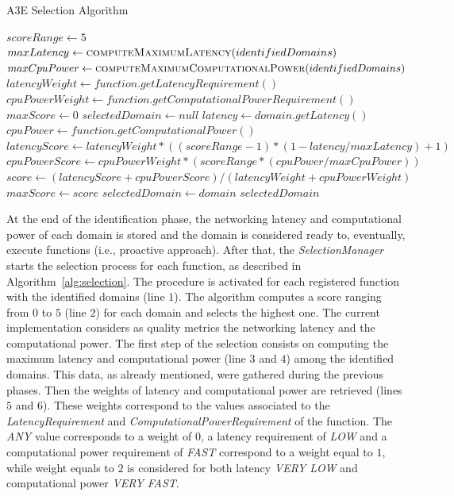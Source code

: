 \begin{algorithm}[b]
	\caption{A3E Selection Algorithm}
	\label{alg:selection}
	\begin{algorithmic}[1]
		
		\State$scoreRange \gets 5$
		\State $maxLatency \gets \Call{computeMaximumLatency}{identifiedDomains}$
		\State $maxCpuPower \gets \Call{computeMaximumComputationalPower}{identifiedDomains}$
		\State $latencyWeight \gets function.getLatencyRequirement()$ 
		\State $cpuPowerWeight \gets function.getComputationalPowerRequirement()$ 
		\State $maxScore \gets 0$
		\State $selectedDomain \gets null$
		\State $latency \gets domain.getLatency()$ 
		\State $cpuPower \gets function.getComputationalPower()$ 
		\State $latencyScore \gets latencyWeight*((scoreRange-1)*(1 - latency/maxLatency)+1)$ 
		\State $cpuPowerScore \gets cpuPowerWeight*(scoreRange*(cpuPower/maxCpuPower))$
		\State $score \gets (latencyScore + cpuPowerScore) / (latencyWeight + cpuPowerWeight)$
		\State $maxScore \gets score$
		\State $selectedDomain \gets domain$
		\EndIf
		\EndFor 
		\State \Return $selectedDomain$
		\EndFunction
	\end{algorithmic}
\end{algorithm}

At the end of the identification phase, the networking latency and computational power of each domain is stored and the domain is considered ready to, eventually, execute functions (i.e., proactive approach). After that, the \textit{SelectionManager} starts the selection process for each function, as described in Algorithm~\ref{alg:selection}. The procedure is activated for each registered function with the identified domains (line $1$). The algorithm computes a score ranging from $0$ to $5$ (line $2$) for each domain and selects the highest one. The current implementation considers as quality metrics the networking latency and the computational power. The first step of the selection consists on computing the maximum latency and computational power (line $3$ and $4$) among the identified domains. This data, as already mentioned, were gathered during the previous phases. Then the weights of latency and computational power are retrieved (lines $5$ and $6$). These weights correspond to the values associated to the \textit{LatencyRequirement} and \textit{ComputationalPowerRequirement} of the function. The \textit{ANY} value corresponds to a weight of $0$, a latency requirement of \textit{LOW} and a computational power requirement of \textit{FAST} correspond to a weight equal to $1$, while weight equals to $2$ is considered for both latency \textit{VERY LOW} and computational power \textit{VERY FAST}.

